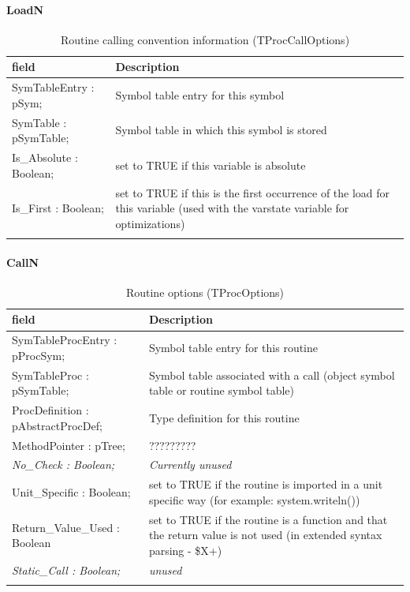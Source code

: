 \documentclass [a4paper,12pt]{article}
\begin{document}
\paragraph{LoadN}\mbox{}

\begin{longtable}{|l|p{10cm}|}
\hline
field	& Description \\
\hline
\endhead
\hline
\endfoot
\textsf{SymTableEntry : pSym;}&
	Symbol table entry for this symbol \\
\textsf{SymTable : pSymTable;}&
	Symbol table in which this symbol is stored \\
\textsf{Is{\_}Absolute : Boolean;}&
	set to TRUE if this variable is absolute \\
\textsf{Is{\_}First : Boolean;}&
	set to TRUE if this is the first occurrence of the load for this
	variable (used with the varstate variable for optimizations) \\
\hline
\caption{Routine calling convention information (TProcCallOptions)}
\label{tab12}
\end{longtable}

\paragraph{CallN}\mbox{}

\begin{longtable}{|l|p{10cm}|}
\hline
field	& Description \\
\hline
\endhead
\hline
\endfoot
\textsf{SymTableProcEntry : pProcSym;}&
	Symbol table entry for this routine \\
\textsf{SymTableProc : pSymTable;}&
	Symbol table associated with a call (object symbol table or routine
	symbol table) \\
\textsf{ProcDefinition : pAbstractProcDef;}&
	Type definition for this routine \\
\textsf{MethodPointer : pTree;}&
	????????? \\
\textsf{\textit{No{\_}Check : Boolean;}}&
	\textit{Currently unused} \\
\textsf{Unit{\_}Specific : Boolean;}&
	set to TRUE if the routine is imported in a unit specific way (for
	example: system.writeln()) \\
\textsf{Return{\_}Value{\_}Used : Boolean}&
	set to TRUE if the routine is a function and that the return value
	is not used (in extended syntax parsing - {\$}X+) \\
\textsf{\textit{Static{\_}Call : Boolean;}}&
	\textit{unused} \\
\hline
\caption{Routine options (TProcOptions)}
\label{tab13}
\end{longtable}
\end{document}

